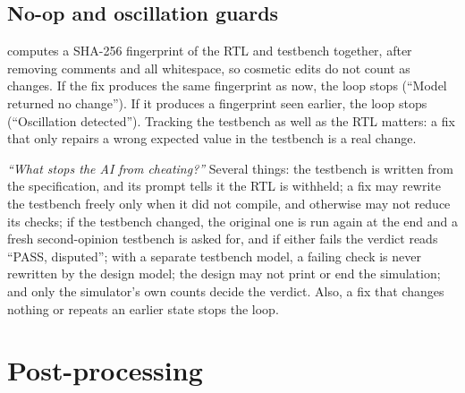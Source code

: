 \subsection{No-op and oscillation guards}

 computes a SHA-256 fingerprint of the RTL and testbench together, after removing comments and all whitespace, so cosmetic edits do not count as changes. If the fix produces the same fingerprint as now, the loop stops (``Model returned no change''). If it produces a fingerprint seen earlier, the loop stops (``Oscillation detected''). Tracking the testbench as well as the RTL matters: a fix that only repairs a wrong expected value in the testbench is a real change.

\begin{viva}
\emph{``What stops the AI from cheating?''} Several things: the testbench is written from the specification, and its prompt tells it the RTL is withheld; a fix may rewrite the testbench freely only when it did not compile, and otherwise may not reduce its checks; if the testbench changed, the original one is run again at the end and a fresh second-opinion testbench is asked for, and if either fails the verdict reads ``PASS, disputed''; with a separate testbench model, a failing check is never rewritten by the design model; the design may not print or end the simulation; and only the simulator's own counts decide the verdict. Also, a fix that changes nothing or repeats an earlier state stops the loop.
\end{viva}

\section{Post-processing}

